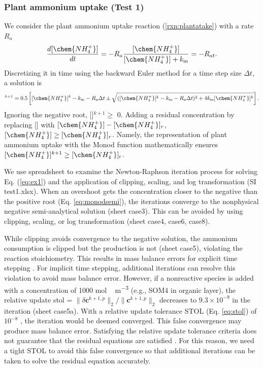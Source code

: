 \documentclass[gmd, manuscript]{copernicus}
\begin{document}
\subsubsection{Plant ammonium uptake (Test 1)}
We consider the plant ammonium uptake reaction (\ref{rxn:plantatake}) with a
rate $R_a$
\begin{equation}
\frac{d[\chem{NH_4^+}]}{dt} =- R_a \frac{[\chem{NH_4^+}]}{[\chem{NH_4^+}]+k_\text{m}} = -R_{at}.
\label{eq:ex1}
\end{equation}
Discretizing it in
time using the backward Euler method for a time step size $\Delta t$, a solution is
\begin{equation}
[\chem{NH_4^+}]^{k+1}=0.5 \left[[\chem{NH_4^+}]^k - k_\text{m} - R_a \Delta t
\pm \sqrt{([\chem{NH_4^+}]^k - k_\text{m} - R_a\Delta t)^2 + 4
k_\text{m}[\chem{NH_4^+}]^k}\right].
\label{eq:monodsemi}
\end{equation}
Ignoring the negative root, []$^{k+1}\geq$
0. Adding a residual concentration by replacing [] with
$[\chem{NH_4^+}]-[\chem{NH_4^+}]_r$, $[\chem{NH_4^+}]\geq[\chem{NH_4^+}]_r$.
Namely, the representation of plant ammonium uptake with the Monod function
mathematically ensures $[\chem{NH_4^+}]^{k+1} \geq [\chem{NH_4^+}]_\text{r}$. 

We use spreadsheet to examine the Newton-Raphson iteration process for solving
Eq. (\ref{eq:ex1}) and the application of clipping, scaling, and log
transformation (SI test1.xlsx). When an overshoot gets the concentration closer
to the negative than the positive root (Eq. \ref{eq:monodsemi}), the iterations
converge to the nonphysical negative semi-analytical solution (sheet case3).
This can be avoided by using clipping, scaling, or log transformation (sheet
case4, case6, case8). 

While clipping avoids convergence to the negative solution, the ammonium
consumption is clipped but the  production is not (sheet case5),
violating the reaction stoichiometry. This results in mass balance errors for
explicit time stepping \citet{Tang2015}. For  implicit time stepping,
additional iterations can resolve this violation to avoid mass balance error.
However, if a nonreactive species is added with a concentration of 1000
\unit{mol\,m^{-3}} (e.g., SOM4 in organic layer), the relative update stol =
${\|\delta \mathbf{c}^{k+1,p}\|_2}/{\|\mathbf{c}^{k+1,p} \|_2}$ decreases to
$9.3\times 10^{-9}$ in the iteration (sheet case5a). With a relative update
tolerance STOL (Eq. \ref{eq:stol}) of $10^{-8}$ , the iteration would be deemed
converged. This false convergence may produce mass balance error. Satisfying
the relative update tolerance criteria does not guarantee that the residual
equations are satisfied \citep{Lichtner2015}. For this reason, we need a tight
STOL to avoid this false convergence so that additional iterations can be taken
to solve the residual equation accurately. 
 
\end{document}

